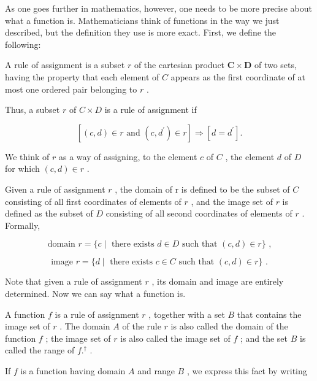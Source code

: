 As one goes further in mathematics, however, one needs to be more precise about what a function is. Mathematicians think of functions in the way we just described, but the definition they use is more exact. First, we define the following:

\begin{definition} A rule of assignment is a subset \(r\) of the cartesian product \(\mathbf{C} \times  \mathbf{D}\) of two sets, having the property that each element of \(C\) appears as the first coordinate of at most one ordered pair belonging to \(r\) .


Thus, a subset \(r\) of \(C \times  D\) is a rule of assignment if

\[
\left\lbrack  {\left( {c,d}\right)  \in  r\text{ and }\left( {c,{d}^{\prime }}\right)  \in  r}\right\rbrack \Rightarrow  \left\lbrack  {d = {d}^{\prime }}\right\rbrack  .
\]

We think of \(r\) as a way of assigning, to the element \(c\) of \(C\) , the element \(d\) of \(D\) for which \(\left( {c,d}\right)  \in  r\) .

Given a rule of assignment \(r\) , the domain of \(\mathrm{r}\) is defined to be the subset of \(C\) consisting of all first coordinates of elements of \(r\) , and the image set of \(r\) is defined as the subset of \(D\) consisting of all second coordinates of elements of \(r\) . Formally,

\[
\text{ domain }r = \{ c \mid  \text{ there exists }d \in  D\text{ such that }\left( {c,d}\right)  \in  r\} \text{ , }
\]

\[
\text{ image }r = \{ d \mid  \text{ there exists }c \in  C\text{ such that }\left( {c,d}\right)  \in  r\} \text{ . }
\]
\end{definition}

Note that given a rule of assignment \(r\) , its domain and image are entirely determined. Now we can say what a function is.

\begin{definition} A function \(f\) is a rule of assignment \(r\) , together with a set \(B\) that contains the image set of \(r\) . The domain \(A\) of the rule \(r\) is also called the domain of the function \(f\) ; the image set of \(r\) is also called the image set of \(f\) ; and the set \(B\) is called the range of \(f{.}^{\dagger}\) .
\end{definition}

If \(f\) is a function having domain \(A\) and range \(B\) , we express this fact by writing

